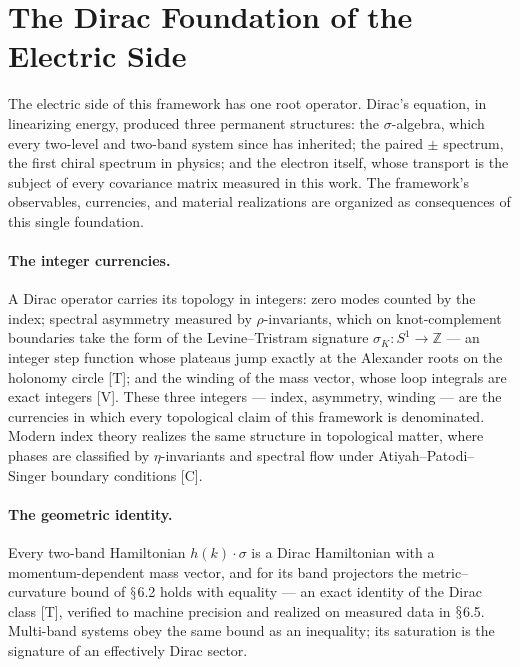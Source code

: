 \documentclass[11pt]{article}
\theoremstyle{definition}
\theoremstyle{plain}
\begin{document}
\section{The Dirac Foundation of the Electric Side}

The electric side of this framework has one root operator. Dirac's equation, in
linearizing energy, produced three permanent structures: the $\sigma$-algebra,
which every two-level and two-band system since has inherited; the paired $\pm$
spectrum, the first chiral spectrum in physics; and the electron itself, whose
transport is the subject of every covariance matrix measured in this work. The
framework's observables, currencies, and material realizations are organized as
consequences of this single foundation.

\paragraph{The integer currencies.}
A Dirac operator carries its topology in integers: zero modes counted by the index;
spectral asymmetry measured by $\rho$-invariants, which on knot-complement
boundaries take the form of the Levine--Tristram signature $\sigma_K : S^1 \to
\mathbb{Z}$ --- an integer step function whose plateaus jump exactly at the
Alexander roots on the holonomy circle [T]; and the winding of the mass vector,
whose loop integrals are exact integers [V]. These three integers --- index,
asymmetry, winding --- are the currencies in which every topological claim of this
framework is denominated. Modern index theory realizes the same structure in
topological matter, where phases are classified by $\eta$-invariants and spectral
flow under Atiyah--Patodi--Singer boundary conditions [C].

\paragraph{The geometric identity.}
Every two-band Hamiltonian $h(k)\cdot\sigma$ is a Dirac Hamiltonian with a
momentum-dependent mass vector, and for its band projectors the metric--curvature
bound of $\mathsection$6.2 holds with equality --- an exact identity of the Dirac class [T],
verified to machine precision and realized on measured data in $\mathsection$6.5. Multi-band
systems obey the same bound as an inequality; its saturation is the signature of an
effectively Dirac sector.
\end{document}
